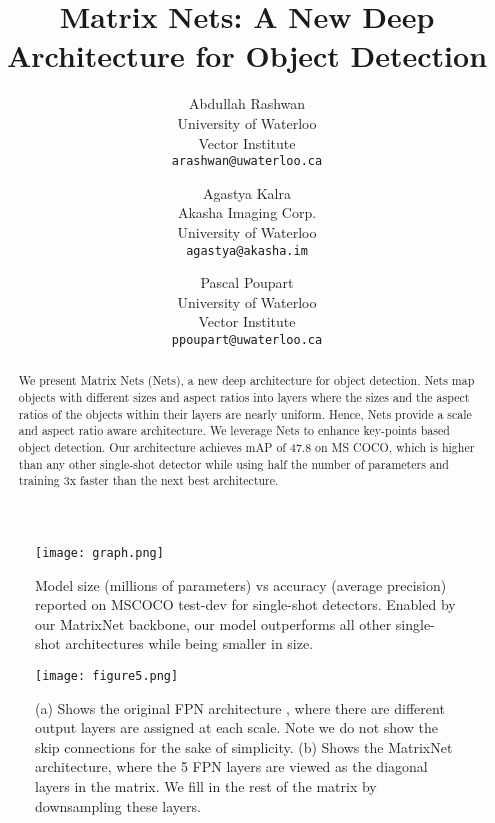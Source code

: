 \documentclass[10pt,twocolumn,letterpaper]{article}
\begin{document}
\title{Matrix Nets: A New Deep Architecture for Object Detection}

\author{Abdullah Rashwan\\
University of Waterloo\\
Vector Institute\\
{\tt\small arashwan@uwaterloo.ca}
\and
Agastya Kalra\\
Akasha Imaging Corp. \\
University of Waterloo\\
{\tt\small agastya@akasha.im} \and
Pascal Poupart\\
University of Waterloo\\
Vector Institute\\
{\tt\small ppoupart@uwaterloo.ca}}




\maketitle
\ificcvfinal\thispagestyle{empty}\fi
 \begin{figure}[t]
\begin{center}
\texttt{[image: graph.png]}
\vspace{-0.5cm}
\end{center}
   \caption{Model size (millions of parameters) vs accuracy (average precision) reported on MSCOCO test-dev for single-shot detectors. Enabled by our MatrixNet backbone, our model outperforms all other single-shot architectures while being smaller in size.}
\label{fig:parameters_map}
\vspace{-0.5cm}
\end{figure}
\begin{abstract}
We present Matrix Nets (Nets), a new deep architecture for object detection. Nets map objects with different sizes and aspect ratios into layers where the sizes and the aspect ratios of the objects within their layers are nearly uniform. Hence, Nets provide a scale and aspect ratio aware architecture. We leverage Nets to enhance key-points based object detection. Our architecture achieves mAP of 47.8 on MS COCO, which is higher than any other single-shot detector while using half the number of parameters and training 3x faster than the next best architecture.
\end{abstract}
\begin{figure}[t]
\begin{center}
\texttt{[image: figure5.png]}
\vspace{-0.5cm}
\end{center}
   \caption{(a) Shows the original FPN architecture \cite{lin2017feature}, where there are different output layers are assigned at each scale. Note we do not show the skip connections for the sake of simplicity. (b) Shows the MatrixNet architecture, where the 5 FPN layers are viewed as the diagonal layers in the matrix. We fill in the rest of the matrix by downsampling these layers.}
\label{fig:xnets}
\vspace{-0.5cm}
\end{figure}
\end{document}
